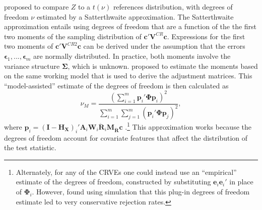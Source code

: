 \documentclass[12pt]{article}\usepackage[]{graphicx}\usepackage[]{color}
\newcommand{\E}{\text{E}}
\newcommand{\Var}{\text{Var}}
\newcommand{\bm}{\mathbf}
\newcommand{\bs}{\boldsymbol}
\begin{document}
\citet{Bell2002bias} proposed to compare $Z$ to a $t(\nu)$ references distribution, with degrees of freedom $\nu$ estimated by a Satterthwaite approximation.
The Satterthwaite approximation \citep{Satterthwaite1946approximate} entails using degrees of freedom that are a function of the the first two moments of the sampling distribution of $\bm{c}' \bm{V}^{CR} \bm{c}$.
Expressions for the first two moments of $\bm{c}'\bm{V}^{CR2}\bm{c}$ can be derived under the assumption that the errors $\bs\epsilon_1,...,\bs\epsilon_m$ are normally distributed. 
In practice, both moments involve the variance structure $\bs\Sigma$, which is unknown. 
\citet{Bell2002bias} proposed to estimate the moments based on the same working model that is used to derive the adjustment matrices. 
This ``model-assisted'' estimate of the degrees of freedom is then calculated as 
\begin{equation}
\label{eq:nu_model}
\nu_{M} = \frac{\left(\sum_{i=1}^m \bm{p}_i' \bs\Phi \bm{p}_i\right)^2}{\sum_{i=1}^m \sum_{j=1}^m \left(\bm{p}_i' \bs\Phi \bm{p}_j\right)^2},
\end{equation}
where $\bm{p}_i = \left(\bm{I} - \bm{H_X}\right)_i'\bm{A}_i \bm{W}_i\bm{\ddot{R}}_i\bm{M_{\ddot{R}}} \bm{c}$\todo{Can we use $\bm{H_{\ddot{U}}}$ here instead?} .\footnote{Alternately, for any of the CRVEs one could instead use an ``empirical'' estimate of the degrees of freedom, constructed by substituting $\bm{e}_i \bm{e}_i'$ in place of $\bs\Phi_i$. 
However, \citet{Bell2002bias} found using simulation that this plug-in degrees of freedom estimate led to very conservative rejection rates.}
This approximation works because the degrees of freedom account for covariate features that affect the distribution of the test statistic. 
\end{document}
